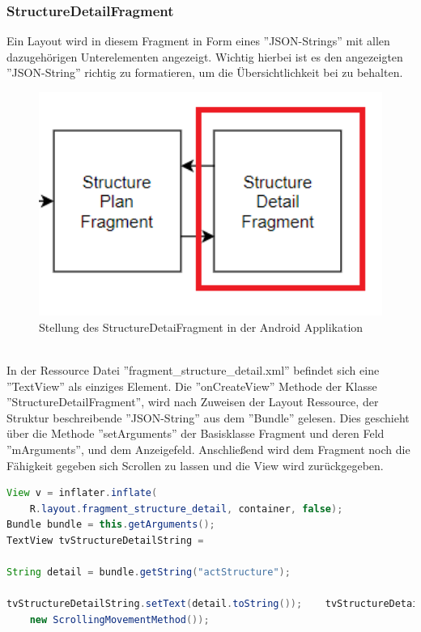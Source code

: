 \subsubsection{StructureDetailFragment}
Ein Layout wird in diesem Fragment in Form eines ''JSON-Strings'' mit allen dazugehörigen Unterelementen angezeigt. Wichtig hierbei ist es den angezeigten ''JSON-String'' richtig zu formatieren, um die Übersichtlichkeit bei zu behalten.
\\
\begin{figure}[H]
\centering
\includegraphics[width=1.0\textwidth]{images/06_AndroidApp/06_StructureDetailStellung}
\caption{Stellung des StructureDetaiFragment in der Android Applikation}
\label{fig:mediaNav}
\end{figure}
\\
In der Ressource Datei ''fragment\_structure\_detail.xml'' befindet sich eine ''TextView'' als einziges Element. Die ''onCreateView'' Methode der Klasse ''StructureDetailFragment'', wird nach Zuweisen der Layout Ressource, der Struktur beschreibende ''JSON-String'' aus dem ''Bundle'' gelesen. Dies geschieht über die Methode ''setArguments'' der Basisklasse Fragment und deren Feld ''mArguments'', und dem Anzeigefeld. Anschließend wird dem Fragment noch die Fähigkeit gegeben sich Scrollen zu lassen und die View wird zurückgegeben. 
\begin{lstlisting}[language=Java,caption={Übernahme und anzeigen der Daten im StructureDetailFragment}]
View v = inflater.inflate(
	R.layout.fragment_structure_detail, container, false);
Bundle bundle = this.getArguments();
TextView tvStructureDetailString = 													v.findViewById(R.id.tvStructureDetailString);
    
String detail = bundle.getString("actStructure");
    
tvStructureDetailString.setText(detail.toString());    tvStructureDetailString.setMovementMethod(
    new ScrollingMovementMethod());
\end{lstlisting}
